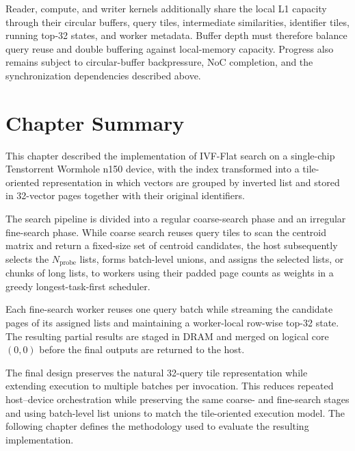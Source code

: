 Reader, compute, and writer kernels additionally share the local L1 capacity through their circular buffers, query tiles, intermediate similarities, identifier tiles, running top-32 states, and worker metadata. Buffer depth must therefore balance query reuse and double buffering against local-memory capacity. Progress also remains subject to circular-buffer backpressure, NoC completion, and the synchronization dependencies described above.

\section{Chapter Summary}
\label{sec:design-summary}

This chapter described the implementation of IVF-Flat search on a single-chip Tenstorrent Wormhole n150 device, with the index transformed into a tile-oriented representation in which vectors are grouped by inverted list and stored in 32-vector pages together with their original identifiers.

The search pipeline is divided into a regular coarse-search phase and an irregular fine-search phase. While coarse search reuses query tiles to scan the centroid matrix and return a fixed-size set of centroid candidates, the host subsequently selects the \(N_{\mathrm{probe}}\) lists, forms batch-level unions, and assigns the selected lists, or chunks of long lists, to workers using their padded page counts as weights in a greedy longest-task-first scheduler.

Each fine-search worker reuses one query batch while streaming the candidate pages of its assigned lists and maintaining a worker-local row-wise top-32 state. The resulting partial results are staged in DRAM and merged on logical core \((0,0)\) before the final outputs are returned to the host.

The final design preserves the natural 32-query tile representation while extending execution to multiple batches per invocation. This reduces repeated host--device orchestration while preserving the same coarse- and fine-search stages and using batch-level list unions to match the tile-oriented execution model. The following chapter defines the methodology used to evaluate the resulting implementation.
